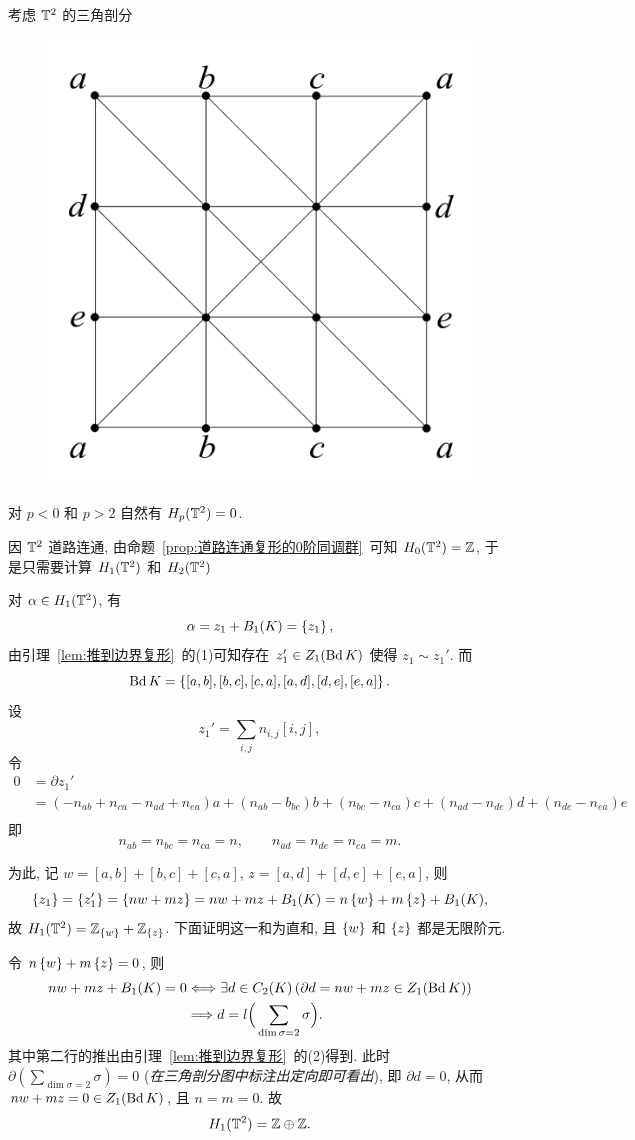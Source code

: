     \begin{Example}[$ \T^2 $ 的同调群]
        考虑 $ \T^2 $ 的三角剖分
		\begin{figure}[htbp]
    		\centering
        	\includegraphics[width=0.25\linewidth]{figures/Sec3-10.png}
    	\end{figure}

		对 $ p<0 $ 和 $ p>2 $ 自然有 $ H_p(\mathbb{T}^2)=0 $.
    
    因 $ \T^2 $ 道路连通, 由命题~\ref{prop:道路连通复形的0阶同调群}~可知 $ H_0(\mathbb{T}^2)=\mathbb{Z} $, 于是只需要计算 $ H_1(\mathbb{T}^2) $ 和 $ H_2(\mathbb{T}^2) $

    对 $ \alpha\in H_1(\mathbb{T}^2) $, 有
    \[
        \alpha=z_1+B_1(K)=\left\{ z_1 \right\}, 
    \]
    由引理~\ref{lem:推到边界复形}~的(1)可知存在 $ z_1'\in Z_1(\mathrm{Bd}\, K) $ 使得 $ z_1\sim z_1' $. 而
    \[
        \mathrm{Bd}\, K=\left\{ [a,b],[b,c],[c,a],[a,d],[d,e],[e,a] \right\}.
    \]
    设
    \[
        z_1'=\sum_{i,j}n_{i,j}[i,j],
    \]
    令
    \[
        \begin{aligned}
            0&=\partial z_1'\\
            &=(-n_{ab}+n_{ca}-n_{ad}+n_{ea})a+(n_{ab}-b_{bc})b+(n_{bc}-n_{ca})c+(n_{ad}-n_{de})d+(n_{de}-n_{ea})e\\
        \end{aligned}
    \]
    即
    \[
        n_{ab}=n_{bc}=n_{ca}=n,\qquad n_{ad}=n_{de}=n_{ea}=m.
    \]

    为此, 记 $ w=[a,b]+[b,c]+[c,a] $, $ z=[a,d]+[d,e]+[e,a] $, 则
    \[
        \left\{ z_1 \right\}=\left\{ z_1' \right\}=\left\{ nw+mz \right\}=nw+mz+B_1(K)=n\left\{ w \right\}+m\left\{ z \right\}+B_1(K),
    \]
    故 $ H_1(\mathbb{T}^2)=\mathbb{Z}_{\left\{ w \right\}}+\mathbb{Z}_{\left\{ z \right\}} $. 下面证明这一和为直和, 且 $ \left\{ w \right\} $ 和 $ \left\{ z \right\} $ 都是无限阶元.

    令 $ n\left\{ w \right\}+m\left\{ z \right\}=0 $, 则
    \[
        \begin{aligned}
            nw+mz+B_1(K)=0& \Longleftrightarrow \exists d\in C_2(K)\,(\partial d=nw+mz\in Z_1(\mathrm{Bd}\, K))\\
            & \Longrightarrow d=l\Big( \sum_{\dim\sigma=2}\sigma \Big).
        \end{aligned}
    \]
    其中第二行的推出由引理~\ref{lem:推到边界复形}~的(2)得到. 此时 $ \partial\left(\sum_{\dim\sigma=2}\sigma\right)=0 $ (\textit{在三角剖分图中标注出定向即可看出}), 即 $ \partial d=0 $, 从而 $ nw+mz=0\in Z_1(\mathrm{Bd}\, K) $, 且 $ n=m=0 $. 故
    \[
        H_1(\mathbb{T}^2)=\mathbb{Z}\oplus\mathbb{Z}.
    \]


\end{Example}

